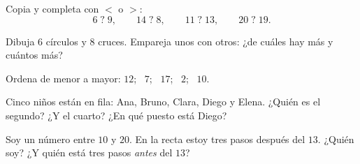 \begin{exercise}[$\star$]\label{exo:g1:counting:5}
Copia y completa con $<$ o $>$:
\[
6 \;?\; 9, \qquad
14 \;?\; 8, \qquad
11 \;?\; 13, \qquad
20 \;?\; 19 .
\]
\end{exercise}

\begin{exercise}[$\star$]\label{exo:g1:counting:6}
Dibuja $6$ círculos y $8$ cruces. Empareja unos con otros: ¿de cuáles hay más
y cuántos más?
\end{exercise}

\begin{exercise}[$\star$]\label{exo:g1:counting:7}
Ordena de menor a mayor: $12$; \ $7$; \ $17$; \ $2$; \ $10$.
\end{exercise}

\begin{exercise}[$\star$]\label{exo:g1:counting:8}
Cinco niños están en fila: Ana, Bruno, Clara, Diego y Elena. ¿Quién es
el segundo? ¿Y el cuarto? ¿En qué puesto está Diego?
\end{exercise}

\begin{exercise}[$\star\star$]\label{exo:g1:counting:9}
Soy un número entre $10$ y $20$. En la recta estoy
tres pasos después del $13$. ¿Quién soy? ¿Y quién está tres pasos
\emph{antes} del $13$?
\end{exercise}
